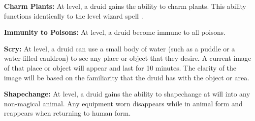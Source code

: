 \begin{multicols*}{2}
\textbf{Charm Plants:} At  level, a druid gains the ability to charm plants. This ability functions identically to the  level wizard spell .

\textbf{Immunity to Poisons:} At  level, a druid become immune to all poisons.

\textbf{Scry:} At  level, a druid can use a small body of water (such as a puddle or a water-filled cauldron) to see any place or object that they desire. A current image of that place or object will appear and last for 10 minutes. The clarity of the image will be based on the familiarity that the druid has with the object or area.

\textbf{Shapechange:} At  level, a druid gains the ability to shapechange at will into any non-magical animal. Any equipment worn disappears while in animal form and reappears when returning to human form.


\end{multicols*}
